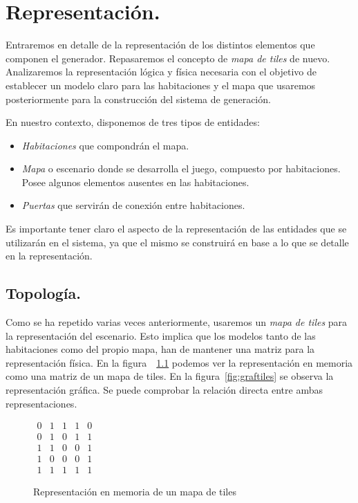 \chapter{Representación.}\label{cap:capitulo3}

Entraremos en detalle de la representación de los distintos elementos que componen el generador. Repasaremos el concepto de \emph{mapa de tiles} de nuevo. Analizaremos la representación lógica y física necesaria con el objetivo de establecer un modelo claro para las habitaciones y el mapa que usaremos posteriormente para la construcción del sistema de generación.


En nuestro contexto, disponemos de tres tipos de entidades:

\begin{itemize}
	\item \emph{Habitaciones} que compondrán el mapa.
	\item \emph{Mapa} o escenario donde se desarrolla el juego, compuesto por habitaciones. Posee algunos elementos ausentes en las habitaciones.
	\item \emph{Puertas} que servirán de conexión entre habitaciones.
\end{itemize}

Es importante tener claro el aspecto de la representación de las entidades que se utilizarán en el sistema, ya que el mismo se construirá en base a lo que se detalle en la representación.

\section{Topología.}

Como se ha repetido varias veces anteriormente, usaremos un \emph{mapa de tiles} para la representación del escenario. Esto implica que los modelos tanto de las habitaciones como del propio mapa, han de mantener una matriz para la representación física. En la figura~~\ref{fig:memtiles} podemos ver la representación en memoria como una matriz de un mapa de tiles. En la figura~\ref{fig:graftiles} se observa la representación gráfica. Se puede comprobar la relación directa entre ambas representaciones.


\begin{figure}[h]
\centering
{
	$
\begin{matrix}
	0 & 1 & 1 & 1 & 0 \\
	0 & 1 & 0 & 1 & 1 \\
	1 & 1 & 0 & 0 & 1 \\
	1 & 0 & 0 & 0 & 1 \\
	1 & 1 & 1 & 1 & 1
\end{matrix}
$
}
\caption{Representación en memoria de un mapa de tiles
\label{fig:memtiles}
}
\end{figure}

